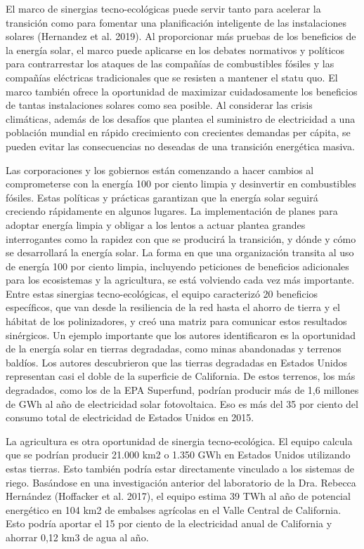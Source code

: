 \documentclass[runningheads]{llncs}
\begin{document}
El marco de sinergias tecno-ecológicas puede servir tanto para acelerar la transición como para fomentar una planificación inteligente de las instalaciones solares (Hernandez et al. 2019). Al proporcionar más pruebas de los beneficios de la energía solar, el marco puede aplicarse en los debates normativos y políticos para contrarrestar los ataques de las compañías de combustibles fósiles y las compañías eléctricas tradicionales que se resisten a mantener el statu quo. El marco también ofrece la oportunidad de maximizar cuidadosamente los beneficios de tantas instalaciones solares como sea posible. Al considerar las crisis climáticas, además de los desafíos que plantea el suministro de electricidad a una población mundial en rápido crecimiento con crecientes demandas per cápita, se pueden evitar las consecuencias no deseadas de una transición energética masiva.\\ \par
Las corporaciones y los gobiernos están comenzando a hacer cambios al comprometerse con la energía 100 por ciento limpia y desinvertir en combustibles fósiles. Estas políticas y prácticas garantizan que la energía solar seguirá creciendo rápidamente en algunos lugares. La implementación de planes para adoptar energía limpia y obligar a los lentos a actuar plantea grandes interrogantes como la rapidez con que se producirá la transición, y dónde y cómo se desarrollará la energía solar. La forma en que una organización transita al uso de energía 100 por ciento limpia, incluyendo peticiones de beneficios adicionales para los ecosistemas y la agricultura, se está volviendo cada vez más importante.
Entre estas sinergias tecno-ecológicas, el equipo caracterizó 20 beneficios específicos, que van desde la resiliencia de la red hasta el ahorro de tierra y el hábitat de los polinizadores, y creó una matriz para comunicar estos resultados sinérgicos. Un ejemplo importante que los autores identificaron es la oportunidad de la energía solar en tierras degradadas, como minas abandonadas y terrenos baldíos. Los autores descubrieron que las tierras degradadas en Estados Unidos representan casi el doble de la superficie de California. De estos terrenos, los más degradados, como los de la EPA Superfund, podrían producir más de 1,6 millones de GWh al año de electricidad solar fotovoltaica. Eso es más del 35 por ciento del consumo total de electricidad de Estados Unidos en 2015.\\ \par
La agricultura es otra oportunidad de sinergia tecno-ecológica. El equipo calcula que se podrían producir 21.000 km2 o 1.350 GWh en Estados Unidos utilizando estas tierras. Esto también podría estar directamente vinculado a los sistemas de riego. Basándose en una investigación anterior del laboratorio de la Dra. Rebecca Hernández (Hoffacker et al. 2017), el equipo estima 39 TWh al año de potencial energético en 104 km2 de embalses agrícolas en el Valle Central de California. Esto podría aportar el 15 por ciento de la electricidad anual de California y ahorrar 0,12 km3 de agua al año.\\ \par
\end{document}
